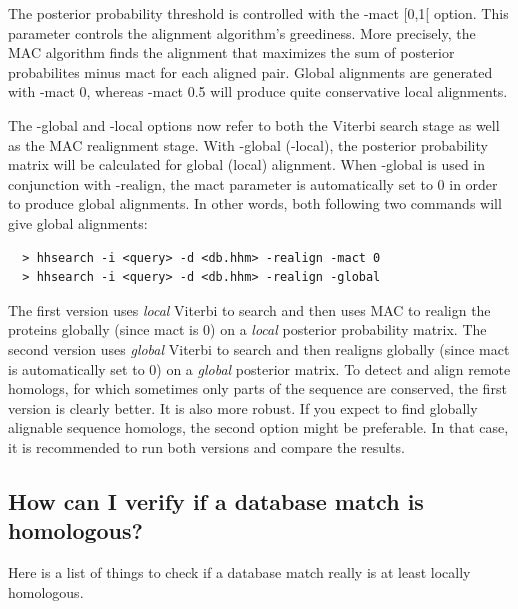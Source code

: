 \documentclass[11pt,a4paper]{article}
\begin{document}
The posterior probability threshold is controlled with the -mact [0,1[ option. 
This parameter controls the alignment algorithm's greediness. More precisely, the 
MAC algorithm finds the alignment that maximizes the sum of posterior probabilites 
minus mact for each aligned pair. Global alignments are generated with -mact 0, 
whereas -mact 0.5 will produce quite conservative local alignments. 

The -global and -local options now refer to both the Viterbi search stage as 
well as the MAC realignment stage. With -global (-local), the posterior probability 
matrix will be calculated for global (local) alignment. When -global is used in 
conjunction with -realign, the mact parameter is automatically set to 0 in order to 
produce global alignments. In other words, both following two commands will give 
global alignments:
\begin{verbatim}
  > hhsearch -i <query> -d <db.hhm> -realign -mact 0
  > hhsearch -i <query> -d <db.hhm> -realign -global
\end{verbatim}

The first version uses \emph{local} Viterbi to search and then uses MAC to realign the 
proteins globally (since mact is 0) on a \emph{local} posterior probability matrix. The 
second version uses \emph{global} Viterbi to search and then realigns globally (since mact 
is automatically set to 0) on a \emph{global} posterior matrix. To detect and align remote 
homologs, for which sometimes only parts of the sequence are conserved, the first 
version is clearly better. It is also more robust. If you expect to find globally 
alignable sequence homologs, the second option might be preferable. In that case, 
it is recommended to run both versions and compare the results. 

\subsection{How can I verify if a database match is homologous?}

Here is a list of things to check if a database match really is at least locally homologous.
 
\end{document}
